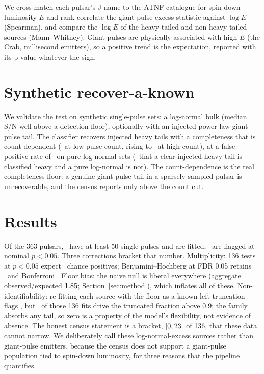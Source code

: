 \documentclass[twocolumn]{aastex631}
\begin{document}
We cross-match each pulsar's J-name to the ATNF catalogue
\citep{manchester2005} for spin-down luminosity $\dot E$ and rank-correlate the giant-pulse excess
statistic against $\log\dot E$ (Spearman), and compare the $\log\dot E$ of the heavy-tailed and
non-heavy-tailed sources (Mann--Whitney). Giant pulses are physically associated with high $\dot E$
(the Crab, millisecond emitters), so a positive trend is the expectation, reported with its p-value
whatever the sign.

\section{Synthetic recover-a-known}
We validate the test on synthetic single-pulse sets: a log-normal bulk (median S/N well above a
detection floor), optionally with an injected power-law giant-pulse tail. The classifier recovers
injected heavy tails with a completeness that is count-dependent (\ptSynCompLow\ at low
pulse count, rising to \ptSynCompHigh\ at high count), at a false-positive rate of \ptSynFP\ on pure
log-normal sets (\ptSynRecovered\ that a clear injected heavy tail is classified heavy and a pure
log-normal is not). The count-dependence is the real completeness floor: a genuine giant-pulse tail
in a sparsely-sampled pulsar is unrecoverable, and the census reports only above the count cut.

\section{Results}
\label{sec:results}
Of the 363 pulsars, \ptRealNFit\ have at least 50 single pulses and are fitted; \ptRealNHeavy\
are flagged at nominal $p<0.05$. Three corrections bracket that number. Multiplicity: 136
tests at $p<0.05$ expect \ptStatChance\ chance positives; Benjamini--Hochberg at FDR 0.05
retains \ptStatBH\ and Bonferroni \ptStatBonf. Floor bias: the naive null is liberal
everywhere (aggregate observed/expected $1.85$; Section~\ref{sec:method}), which
inflates all of these. Non-identifiability: re-fitting each source with the floor as a
known left-truncation flags \ptTruncNHeavy, but \ptTruncFNine\ of those 136 fits drive the
truncated fraction above 0.9; the family absorbs any tail, so zero is a property of the
model's flexibility, not evidence of absence. The honest census statement is a bracket,
$[0, 23]$ of 136, that these data cannot narrow. We deliberately call these log-normal-excess sources rather than giant-pulse emitters,
because the census does not support a giant-pulse population tied to spin-down luminosity, for
three reasons that the pipeline quantifies.
\end{document}
